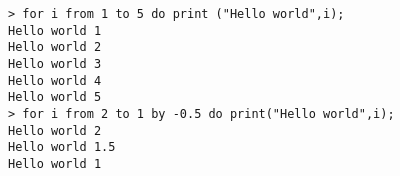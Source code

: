 \begin{center}\begin{minipage}{15cm}\begin{Verbatim}[frame=single]
> for i from 1 to 5 do print ("Hello world",i);
Hello world 1
Hello world 2
Hello world 3
Hello world 4
Hello world 5
> for i from 2 to 1 by -0.5 do print("Hello world",i);
Hello world 2
Hello world 1.5
Hello world 1
\end{Verbatim}
\end{minipage}\end{center}
